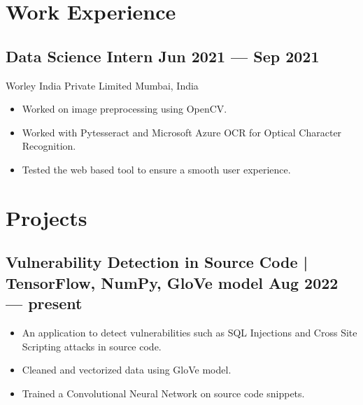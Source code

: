 \documentclass[10pt]{article}
\newcommand{\subtext}[1]{
#1\par\vspace{-0.2cm}}
\newenvironment{zitemize}{
\begin{itemize}\itemsep2pt \parskip0pt \parsep1pt}
{\end{itemize}\vspace{-0.7cm}}
\begin{document}
\section{Work Experience}

\subsection*{Data Science Intern \hfill Jun 2021 --- Sep 2021} 
\subtext{Worley India Private Limited \hfill Mumbai, India} 
    \begin{zitemize}
        \item Worked on image preprocessing using OpenCV.
        \item Worked with Pytesseract and Microsoft Azure OCR for Optical Character Recognition.
        \item Tested the web based tool to ensure a smooth user experience.
    \end{zitemize}
\vspace{-0.2cm}





\section{Projects} %



\subsection*{Vulnerability Detection in Source Code | TensorFlow, NumPy, GloVe model \hfill Aug 2022 --- present}
    \begin{zitemize}
    \item An application to detect vulnerabilities such as SQL Injections and Cross Site Scripting attacks in source code.
     \item Cleaned and vectorized data using GloVe model.
        \item Trained a Convolutional Neural Network on source code snippets.
       
    \end{zitemize}
\end{document}
